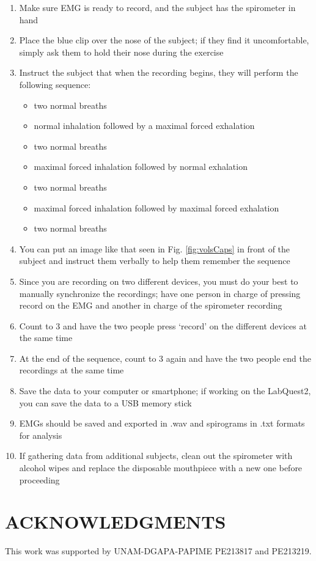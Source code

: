 \documentclass[12pt]{article}
\begin{document}
\begin{enumerate}
\item Make sure EMG is ready to record, and the subject has the spirometer in hand
\item Place the blue clip over the nose of the subject; if they find it uncomfortable, simply ask them to hold their nose during the exercise
\item Instruct the subject that when the recording begins, they will perform the following sequence:
	\begin{itemize}
	\item two normal breaths
    \item normal inhalation followed by a maximal forced exhalation
    \item two normal breaths
    \item maximal forced inhalation followed by normal exhalation
    \item two normal breaths
    \item maximal forced inhalation followed by maximal forced exhalation
    \item two normal breaths
	\end{itemize}
\item You can put an image like that seen in Fig. \ref{fig:volsCaps} in front of the subject and instruct them verbally to help them remember the sequence
\item Since you are recording on two different devices, you must do your best to manually synchronize the recordings; have one person in charge of pressing record on the EMG and another in charge of the spirometer recording
\item Count to 3 and have the two people press `record' on the different devices at the same time
\item At the end of the sequence, count to 3 again and have the two people end the recordings at the same time
\item Save the data to your computer or smartphone; if working on the LabQuest2, you can save the data to a USB memory stick 
\item EMGs should be saved and exported in .wav and spirograms in .txt formats for analysis
\item If gathering data from additional subjects, clean out the spirometer with alcohol wipes and replace the disposable mouthpiece with a new one before proceeding
\end{enumerate}


\section*{ACKNOWLEDGMENTS}
This work was supported by UNAM-DGAPA-PAPIME PE213817 and PE213219.

\renewcommand\refname{REFERENCES}
\renewcommand{\markboth}[2]{}%
\begin{footnotesize}

\end{footnotesize}
\end{document}
